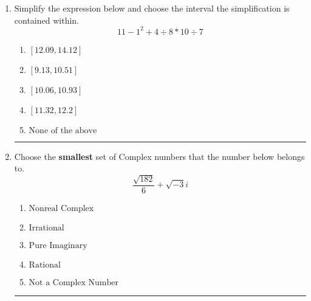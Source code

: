 \documentclass[14pt]{extbook}
\newcommand{\litem}[1]{\item#1\hspace*{-1cm}\rule{\textwidth}{0.4pt}}
\begin{document}
\begin{enumerate}
{\begin{enumerate}[label=\Alph*.]
\end{enumerate} }
\litem{
Simplify the expression below and choose the interval the simplification is contained within.\[ 11 - 1^2 + 4 \div 8 * 10 \div 7 \]\begin{enumerate}[label=\Alph*.]
\item \( [12.09, 14.12] \)
\item \( [9.13, 10.51] \)
\item \( [10.06, 10.93] \)
\item \( [11.32, 12.2] \)
\item \( \text{None of the above} \)

\end{enumerate} }
\litem{
Choose the \textbf{smallest} set of Complex numbers that the number below belongs to.\[ \frac{\sqrt{182}}{6}+\sqrt{-3}i \]\begin{enumerate}[label=\Alph*.]
\item \( \text{Nonreal Complex} \)
\item \( \text{Irrational} \)
\item \( \text{Pure Imaginary} \)
\item \( \text{Rational} \)
\item \( \text{Not a Complex Number} \)

\end{enumerate} }
\end{enumerate}
\end{document}
